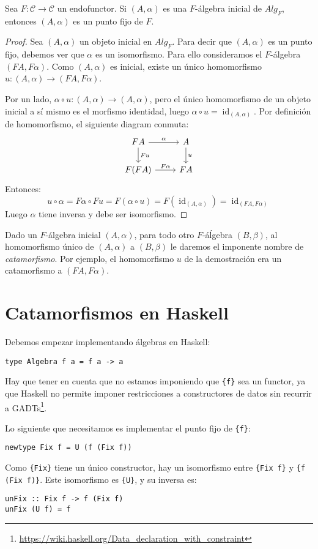\documentclass[12pt, twoside]{book}
\newcommand{\code}[1]{\Verb+{#1}+}
\newcommand{\cat}{{\mathcal{C}}}
\DeclareMathOperator{\id}{id}
\begin{document}
\begin{lemma}
Sea $F \colon \cat \to \cat$ un endofunctor.
Si $(A,\alpha)$ es una $F$-álgebra inicial de $Alg_F$, entonces $(A,\alpha)$ es un punto fijo de $F$.
\end{lemma}
\begin{proof}
Sea $(A,\alpha)$ un objeto inicial en $Alg_F$.
Para decir que $(A,\alpha)$ es un punto fijo, debemos ver que $\alpha$ es un isomorfismo.
Para ello consideramos el $F$-álgebra $(F A, F \alpha)$.
Como $(A,\alpha)$ es inicial, existe un único homomorfismo $u \colon (A, \alpha) \to (F A, F \alpha)$.

Por un lado, $\alpha \circ u \colon (A, \alpha) \to (A, \alpha)$, pero el único homomorfismo de un objeto inicial a sí mismo es el morfismo identidad, luego $\alpha \circ u = \id_{(A, \alpha)}$.
Por definición de homomorfismo, el siguiente diagram conmuta:
\[
\begin{tikzcd}
F A \arrow[r,"\alpha"] \arrow[d,"F u"] & A \arrow[d,"u"]\\
F (F A) \arrow[r,"F \alpha"] & F A
\end{tikzcd}
\]
Entonces:
\[ u \circ \alpha = F \alpha \circ F u = F (\alpha \circ u) = F (\id_{(A, \alpha)}) = \id_{(F A, F \alpha)} \]
Luego $\alpha$ tiene inversa y debe ser isomorfismo.
\end{proof}

Dado un $F$-álgebra inicial $(A,\alpha)$, para todo otro $F$-áĺgebra $(B,\beta)$, al homomorfismo único de $(A,\alpha)$ a $(B,\beta)$ le daremos el imponente nombre de \emph{catamorfismo}.
Por ejemplo, el homomorfismo $u$ de la demostración era un catamorfismo a $(F A, F \alpha)$.

\section{Catamorfismos en Haskell}

Debemos empezar implementando álgebras en Haskell:
\begin{verbatim}
type Algebra f a = f a -> a
\end{verbatim}
Hay que tener en cuenta que no estamos imponiendo que \code{f} sea un functor, ya que Haskell no permite imponer restricciones a constructores de datos sin recurrir a GADTs\footnote{\url{https://wiki.haskell.org/Data_declaration_with_constraint}}.

Lo siguiente que necesitamos es implementar el punto fijo de \code{f}:
\begin{verbatim}
newtype Fix f = U (f (Fix f))
\end{verbatim}
Como \code{Fix} tiene un único constructor, hay un isomorfismo entre \code{Fix f} y \code{f (Fix f)}.
Este isomorfismo es \code{U}, y su inversa es:
\begin{verbatim}
unFix :: Fix f -> f (Fix f)
unFix (U f) = f
\end{verbatim}
\end{document}
